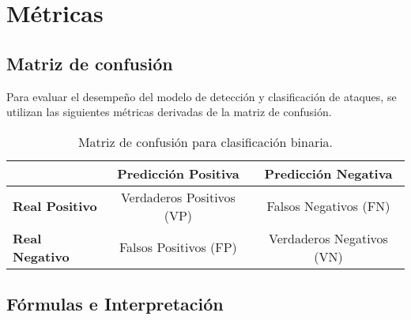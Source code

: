 \section{Métricas}  \label{sec.metricas}
\subsection{Matriz de confusión} \label{sec.matriz-consfusion}
Para evaluar el desempeño del modelo de detección y clasificación de ataques, se utilizan las siguientes métricas derivadas de la matriz de confusión.

\begin{table}[h]
\centering
\label{tab:confusion_matrix}
\begin{tabular}{l|cc}
\hline
 & \textbf{Predicción Positiva} & \textbf{Predicción Negativa} \\ \hline
\textbf{Real Positivo} & Verdaderos Positivos (VP) & Falsos Negativos (FN) \\
\textbf{Real Negativo} & Falsos Positivos (FP) & Verdaderos Negativos (VN) \\ \hline
\end{tabular}
\caption{Matriz de confusión para clasificación binaria.}
\end{table}

\subsection{Fórmulas e Interpretación}

